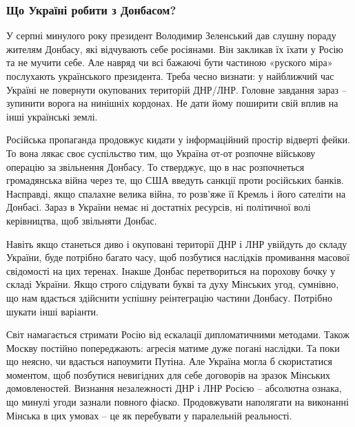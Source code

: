  
 
 
 
 

\subsubsection{Що Україні робити з Донбасом?}
\label{sec:21_01_2022.stz.news.ua.fromua.1.lnr_dnr_marionetki.3.scho_robyty_z_donbasom}

У серпні минулого року президент Володимир Зеленський дав слушну пораду жителям
Донбасу, які відчувають себе росіянами. Він закликав їх їхати у Росію та не
мучити себе. Але навряд чи всі бажаючі бути частиною «руского міра» послухають
українського президента. Треба чесно визнати: у найближчий час Україні не
повернути окупованих територій ДНР/ЛНР. Головне завдання зараз – зупинити
ворога на нинішніх кордонах. Не дати йому поширити свій вплив на інші
українські землі.

Російська пропаганда продовжує кидати у інформаційний простір відверті фейки.
То вона лякає своє суспільство тим, що Україна от-от розпочне військову
операцію за звільнення Донбасу. То стверджує, що в нас розпочнеться
громадянська війна через те, що США введуть санкції проти російських банків.
Насправді, якщо спалахне велика війна, то розв’яже її Кремль і його сателіти на
Донбасі. Зараз в України немає ні достатніх ресурсів, ні політичної волі
керівництва, щоб звільняти Донбас.


Навіть якщо станеться диво і окуповані території ДНР і ЛНР увійдуть до складу
України, буде потрібно багато часу, щоб позбутися наслідків промивання масової
свідомості на цих теренах. Інакше Донбас перетвориться на порохову бочку у
складі України. Якщо строго слідувати букві та духу Мінських угод, сумнівно, що
нам вдасться здійснити успішну реінтеграцію частини Донбасу. Потрібно шукати
інші варіанти.

Світ намагається стримати Росію від ескалації дипломатичними методами. Також
Москву постійно попереджають: агресія матиме дуже погані наслідки. Та поки що
неясно, чи вдасться напоумити Путіна. Але Україна могла б скористатися
моментом, щоб позбутися невигідних для себе договорів на зразок Мінських
домовленостей. Визнання незалежності ДНР і ЛНР Росією – абсолютна ознака, що
минулі угоди зазнали повного фіаско. Продовжувати наполягати на виконанні
Мінська в цих умовах – це як перебувати у паралельній реальності.

